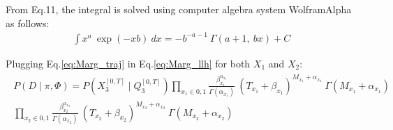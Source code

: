 \documentclass[]{article}
\begin{document}
	From Eq.11, the integral is solved using computer algebra system WolframAlpha as follows:
	\begin{align}
	\int x^{a} \ \exp(-xb) \ dx = -b^{-a-1} \ \Gamma(a+1, \ bx) + C
	\label{eq:integral}
	\end{align}
	
	Plugging Eq.\ref{eq:Marg_traj} in Eq.\ref{eq:Marg_llh} for both $ X_{1} $ and $ X_{2} $:
	\begin{align}
	\begin{split}
		P(\textit{D} \mid \pi, \Phi ) = P(X_{3}^{[0, T]}\mid Q_{3}^{[0, T]}) \prod_{x_{1}\in{0,1}} \frac{\beta_{x_{1}}^{\alpha_{x_{1}}}}{\Gamma(\alpha_{x_{1}})} \ (T_{x_{1}}+\beta_{x_{1}})^{M_{x_{1}} + \alpha_{x_{1}}}\ \Gamma(M_{x_{1}} + \alpha_{x_{1}})  \\  \prod_{x_{2}\in{0,1}} \frac{\beta_{x_{2}}^{\alpha_{x_{2}}}}{\Gamma(\alpha_{x_{2}})} \ (T_{x_{2}}+\beta_{x_{2}})^{M_{x_{2}} + \alpha_{x_{2}}}\ \Gamma(M_{x_{2}} + \alpha_{x_{2}})
	\label{eq:Marg_llh_final}
	\end{split}
	\end{align}
	
\end{document}
